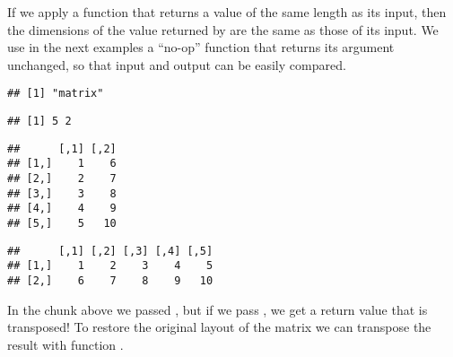 \documentclass[krantz2]{krantz}\usepackage{knitr}%
\begin{document}
\begin{explainbox}
If we apply a function that returns a value of the same length as its input, then the dimensions of the value returned by  are the same as those of its input. We use in the next examples a ``no-op'' function that returns its argument unchanged, so that input and output can be easily compared.

\begin{knitrout}\footnotesize
{}\color{fgcolor}\begin{kframe}
\begin{alltt}
\hlstd{(}\hlstd{)}
 \hlkwb{<-} \hlstd{(}\hlopt{:}\hlstd{,}  \hlstd{=} \hlstd{)}
 \hlkwb{<-} \hlstd{(}
 \hlkwb{<-} \hlstd{(}   \hlstd{=} \hlstd{,}  
\end{alltt}
\begin{verbatim}
## [1] "matrix"
\end{verbatim}
\begin{alltt}
\end{alltt}
\begin{verbatim}
## [1] 5 2
\end{verbatim}
\begin{alltt}
\end{alltt}
\begin{verbatim}
##      [,1] [,2]
## [1,]    1    6
## [2,]    2    7
## [3,]    3    8
## [4,]    4    9
## [5,]    5   10
\end{verbatim}
\begin{alltt}
\end{alltt}
\begin{verbatim}
##      [,1] [,2] [,3] [,4] [,5]
## [1,]    1    2    3    4    5
## [2,]    6    7    8    9   10
\end{verbatim}
\end{kframe}
\end{knitrout}

In the chunk above we passed , but if we pass , we get a return value that is transposed! To restore the original layout of the matrix we can transpose the result with function .


\end{explainbox}
\end{document}
